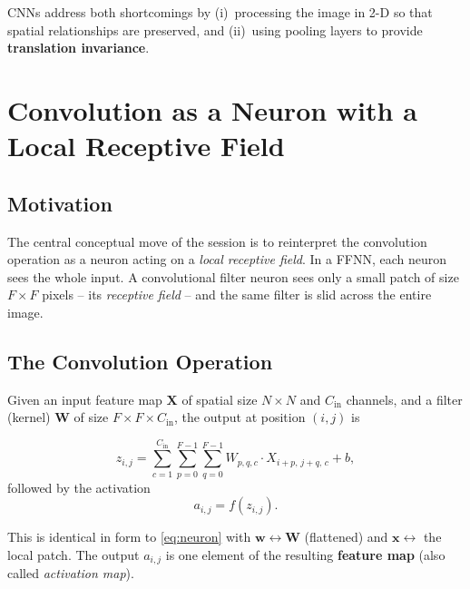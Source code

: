 \documentclass[12pt,a4paper]{article}
\begin{document}
\begin{keyinsight}
CNNs address both shortcomings by (i)~processing the image in 2-D so that
spatial relationships are preserved, and (ii)~using pooling layers to provide
\textbf{translation invariance}.
\end{keyinsight}

\section{Convolution as a Neuron with a Local Receptive Field}
\label{sec:conv_neuron}

\subsection{Motivation}
\label{subsec:conv_motivation}

The central conceptual move of the session is to reinterpret the convolution
operation as a neuron acting on a \emph{local receptive field}.  In a FFNN,
each neuron sees the whole input.  A convolutional filter neuron sees only a
small patch of size $F\times F$ pixels -- its \emph{receptive field} -- and
the same filter is slid across the entire image.

\subsection{The Convolution Operation}
\label{subsec:conv_op}

Given an input feature map $\mathbf{X}$ of spatial size $N\times N$ and
$C_{\text{in}}$ channels, and a filter (kernel) $\mathbf{W}$ of size
$F\times F\times C_{\text{in}}$, the output at position $(i,j)$ is

\begin{equation}
  z_{i,j} = \sum_{c=1}^{C_{\text{in}}}
             \sum_{p=0}^{F-1}\sum_{q=0}^{F-1}
             W_{p,q,c}\cdot X_{i+p,\,j+q,\,c} + b,
  \label{eq:conv_full}
\end{equation}
followed by the activation
\begin{equation}
  a_{i,j} = f(z_{i,j}).
  \label{eq:conv_act}
\end{equation}

This is identical in form to \cref{eq:neuron} with
$\mathbf{w} \leftrightarrow \mathbf{W}$ (flattened) and
$\mathbf{x} \leftrightarrow$ the local patch.  The output $a_{i,j}$ is one
element of the resulting \textbf{feature map} (also called \emph{activation
map}).
\end{document}
